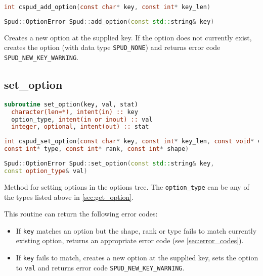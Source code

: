 \documentclass[a4paper, 11pt]{book}
\begin{document}
\begin{lstlisting}[language=C]
int cspud_add_option(const char* key, const int* key_len)
\end{lstlisting}

\begin{lstlisting}[language=C++]
Spud::OptionError Spud::add_option(const std::string& key)
\end{lstlisting}

Creates a new option at the supplied key. If the option does not currently
exist, creates the option (with data type \lstinline+SPUD_NONE+) and
returns error code \lstinline+SPUD_NEW_KEY_WARNING+.

\subsection{set\_option}\label{sec:set_option}

\begin{lstlisting}[language=fortran,emph=option_type,emphstyle=\textit]
subroutine set_option(key, val, stat)
  character(len=*), intent(in) :: key
  option_type, intent(in or inout) :: val
  integer, optional, intent(out) :: stat
\end{lstlisting}

\begin{lstlisting}[language=C,emph=option_type,emphstyle=\textit]
int cspud_set_option(const char* key, const int* key_len, const void* val,
const int* type, const int* rank, const int* shape)
\end{lstlisting}

\begin{lstlisting}[language=C++,emph=option_type,emphstyle=\textit]
Spud::OptionError Spud::set_option(const std::string& key,
const option_type& val)
\end{lstlisting}

Method for setting options in the options tree. The
\lstinline[emph=option_type,emphstyle=\textit]+option_type+ can be any of the
types listed above in \ref{sec:get_option}.

This routine can return the following error codes:
\begin{itemize}
\item If \lstinline+key+ matches an option but the shape, rank or type fails
  to match currently existing option, returns an appropriate error code (see
  \ref{sec:error_codes}).
\item If \lstinline+key+ fails to match, creates a new option at the supplied
  key, sets the option to \lstinline+val+ and returns error code
  \lstinline+SPUD_NEW_KEY_WARNING+.
\end{itemize}
\end{document}
